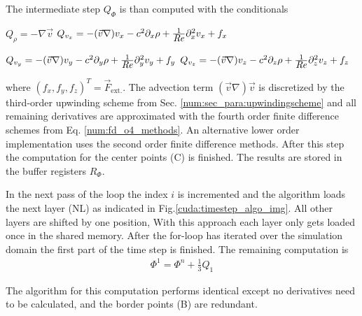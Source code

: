 The intermediate step $Q_{\Phi}$ is than computed with the conditionals
\begin{center}
 \begin{minipage}{.55\linewidth}
\begin{algorithmic}
      \STATE ${Q_{\rho} = -\nabla \vec{v}}$
\ENDIF
{}
      \STATE ${Q_{v_x} = -(\vec{v} \nabla) v_x - c^2\partial_x\rho + \frac{1}{\mbox{\textit{Re}}}\partial^2_xv_x + f_x}$
\ENDIF
\end{algorithmic}
 \end{minipage}

\clearpage

 \begin{minipage}{.55\linewidth}
\begin{algorithmic}
      \STATE ${Q_{v_y} = -(\vec{v} \nabla) v_y - c^2\partial_y\rho + \frac{1}{\mbox{\textit{Re}}}\partial^2_yv_y + f_y}$
\ENDIF
{}
      \STATE ${Q_{v_z} = -(\vec{v} \nabla) v_z - c^2\partial_z\rho + \frac{1}{\mbox{\textit{Re}}}\partial^2_zv_z + f_z}$
\ENDIF
\end{algorithmic}
 \end{minipage}
\end{center}

where $(f_x, f_y, f_z)^T = \vec{F}_{\text{ext.}}$. The advection term $(\vec{v}\nabla)\vec{v}$ is discretized by the third-order upwinding scheme from Sec. \ref{num:sec_para:upwindingscheme}
and all remaining derivatives are approximated with the fourth order finite difference schemes from Eq. \ref{num:fd_o4_methods}.
An alternative lower order implementation uses the second order finite difference methods.
After this step the computation for the center points (C) is finished.
The results are stored in the buffer registers $R_\Phi$.

In the next pass of the loop the index $i$ is incremented and the algorithm loads the next layer (NL) as indicated in Fig.\ref{cuda:timestep_algo_img}.
All other layers are shifted by one position, With this approach each layer only gets loaded once in the shared memory.
After the for-loop has iterated over the simulation domain the first part of the time step is finished.
The remaining computation is
\begin{align}
     \Phi^{1} = \Phi^n + \frac{1}{3}Q_1
\end{align}

The algorithm for this computation performs identical except no derivatives need to be calculated, and
the border points (B) are redundant.

